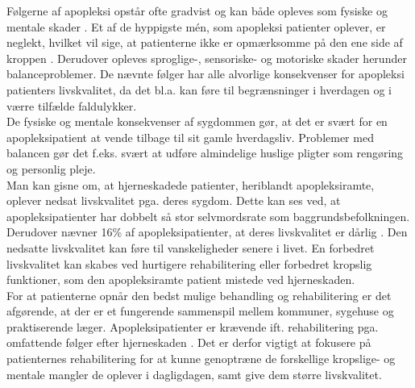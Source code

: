 Følgerne af apopleksi opstår ofte gradvist og kan både opleves som fysiske og mentale skader \cite{Muus2008}. Et af de hyppigste mén, som apopleksi patienter oplever, er neglekt, hvilket vil sige, at patienterne ikke er opmærksomme på den ene side af kroppen \cite{Sundhed.dk}. Derudover opleves sproglige-, sensoriske- og motoriske skader  herunder balanceproblemer. De nævnte følger har alle alvorlige konsekvenser for apopleksi patienters livskvalitet, da det bl.a. kan føre til  begrænsninger i hverdagen og i værre tilfælde faldulykker.\cite{Nichols1997, Muus2008} \\
De fysiske og mentale konsekvenser af sygdommen gør, at det er svært for en apopleksipatient at vende tilbage til sit gamle hverdagsliv. Problemer med balancen gør det f.eks. svært at udføre almindelige huslige pligter som rengøring og personlig pleje.\cite{Sundhedsstyrelsen2010} \\
Man kan gisne om, at hjerneskadede patienter, heriblandt apopleksiramte, oplever nedsat livskvalitet pga. deres sygdom. Dette kan ses ved, at apopleksipatienter har dobbelt så stor selvmordsrate som baggrundsbefolkningen. Derudover nævner 16\% af apopleksipatienter, at deres livskvalitet er dårlig \cite{Sundhedsstyrelsen2010}. Den nedsatte livskvalitet kan føre til vanskeligheder senere i livet. En forbedret livskvalitet kan skabes ved hurtigere rehabilitering eller forbedret kropslig funktioner, som den apopleksiramte patient mistede ved hjerneskaden.\cite{Sundhedsstyrelsen2010} \\
For at patienterne opnår den bedst mulige behandling og rehabilitering er det afgørende, at der er et fungerende sammenspil mellem kommuner, sygehuse og praktiserende læger. Apopleksipatienter er krævende ift. rehabilitering pga. omfattende følger efter hjerneskaden \cite{Sundhedsstyrelsen2010}. Det er derfor vigtigt at fokusere på patienternes rehabilitering for at kunne genoptræne de forskellige kropslige- og mentale mangler de oplever i dagligdagen, samt give dem større livskvalitet. 



